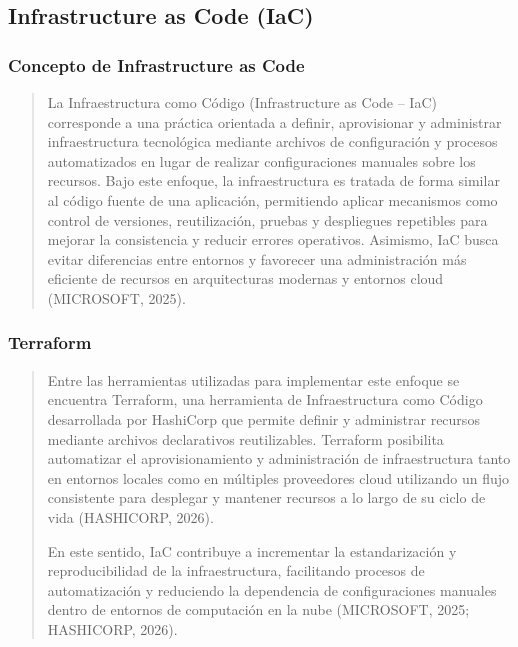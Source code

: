 \documentclass[
]{article}
\begin{document}
\subsection{Infrastructure as Code
(IaC)}\label{infrastructure-as-code-iac}

\subsubsection{Concepto de Infrastructure as
Code}\label{concepto-de-infrastructure-as-code}

\begin{quote}
La Infraestructura como Código (Infrastructure as Code -- IaC)
corresponde a una práctica orientada a definir, aprovisionar y
administrar infraestructura tecnológica mediante archivos de
configuración y procesos automatizados en lugar de realizar
configuraciones manuales sobre los recursos. Bajo este enfoque, la
infraestructura es tratada de forma similar al código fuente de una
aplicación, permitiendo aplicar mecanismos como control de versiones,
reutilización, pruebas y despliegues repetibles para mejorar la
consistencia y reducir errores operativos. Asimismo, IaC busca evitar
diferencias entre entornos y favorecer una administración más eficiente
de recursos en arquitecturas modernas y entornos cloud (MICROSOFT,
2025).
\end{quote}

\subsubsection{Terraform}\label{terraform}

\begin{quote}
Entre las herramientas utilizadas para implementar este enfoque se
encuentra Terraform, una herramienta de Infraestructura como Código
desarrollada por HashiCorp que permite definir y administrar recursos
mediante archivos declarativos reutilizables. Terraform posibilita
automatizar el aprovisionamiento y administración de infraestructura
tanto en entornos locales como en múltiples proveedores cloud utilizando
un flujo consistente para desplegar y mantener recursos a lo largo de su
ciclo de vida (HASHICORP, 2026).

En este sentido, IaC contribuye a incrementar la estandarización y
reproducibilidad de la infraestructura, facilitando procesos de
automatización y reduciendo la dependencia de configuraciones manuales
dentro de entornos de computación en la nube (MICROSOFT, 2025;
HASHICORP, 2026).
\end{quote}
\end{document}
